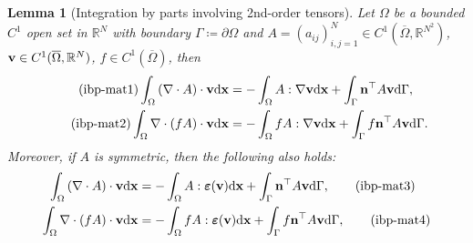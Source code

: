 \documentclass[oneside,11pt]{book}
\numberwithin{equation}{section}
\newtheorem{lemma}{Lemma}[section]
\begin{document}
\begin{lemma}[Integration by parts involving 2nd-order tensors]
    Let $\Omega$ be a bounded $C^1$ open set in $\mathbb{R}^N$ with boundary $\Gamma\coloneqq\partial\Omega$ and $A = (a_{ij})_{i,j=1}^N\in C^1(\overline{\Omega},\mathbb{R}^{N^2})$, ${\bf v}\in C^1(\overline{\Omega},\mathbb{R}^N)$, $f\in C^1(\overline{\Omega})$, then
    \begin{align}
        \label{integration by parts for matrix 1}
        \tag{ibp-mat1}
        \int_\Omega \left(\nabla\cdot A\right)\cdot{\bf v}{\rm d}{\bf x}&= -\int_\Omega A:\nabla{\bf v}{\rm d}{\bf x} + \int_\Gamma {\bf n}^\top A{\bf v}{\rm d}\Gamma,\\
        \label{integration by parts for matrix 2}
        \tag{ibp-mat2}
        \int_\Omega \nabla\cdot(fA)\cdot{\bf v}{\rm d}{\bf x} &= -\int_\Omega fA:\nabla{\bf v}{\rm d}{\bf x} + \int_\Gamma f{\bf n}^\top A{\bf v}{\rm d}\Gamma.
    \end{align}
    Moreover, if $A$ is symmetric, then the following also holds:
    \begin{align}
        \int_\Omega \left(\nabla\cdot A\right)\cdot{\bf v}{\rm d}{\bf x} &= -\int_\Omega A:\boldsymbol{\varepsilon}({\bf v}){\rm d}{\bf x} + \int_\Gamma {\bf n}^\top A{\bf v}{\rm d}\Gamma,\label{integration by parts for matrix 3}\tag{ibp-mat3}\\
        \int_\Omega \nabla\cdot(fA)\cdot{\bf v}{\rm d}{\bf x} &= -\int_\Omega fA:\boldsymbol{\varepsilon}({\bf v}){\rm d}{\bf x} + \int_\Gamma f{\bf n}^\top A{\bf v}{\rm d}\Gamma,\label{integration by parts for matrix 4}\tag{ibp-mat4}
    \end{align}
\end{lemma}
\end{document}
